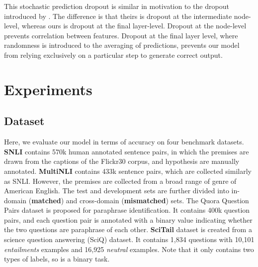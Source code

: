 \documentclass[11pt,a4paper]{article}
\begin{document}
This stochastic prediction dropout is similar in motivation to the dropout introduced by \cite{srivastava2014dropout}. The difference is that theirs is dropout at the intermediate node-level, whereas ours is dropout at the final layer-level. Dropout at the node-level prevents correlation between features. Dropout at the final layer level, where randomness is introduced to the averaging of predictions, prevents our model from relying exclusively on a particular step to generate correct output. 
 \section{Experiments}
\label{sec:exp}
\subsection{Dataset}
\label{sec:data}
Here, we evaluate our model in terms of accuracy on four benchmark datasets. \textbf{SNLI} \cite{bowman2015large} contains 570k human annotated sentence pairs, in which the premises are drawn from the captions of the Flickr30 corpus, and hypothesis are manually annotated. \textbf{MultiNLI} \cite{2017arXiv170405426W} contains 433k sentence pairs, which are collected similarly as SNLI. However, the premises are collected from a broad range of genre of American English. The test and development sets are further divided into in-domain (\textbf{matched}) and cross-domain (\textbf{mismatched}) sets.  The Quora Question Pairs dataset \cite{wang2017bilateral} is proposed for paraphrase identification. It contains 400k question pairs, and each question pair is annotated with a binary value indicating whether the two questions are paraphrase of each other. \textbf{SciTail} dataset is created from a science question answering (SciQ) dataset. It contains 1,834 questions with 10,101 \textit{entailments} examples and 16,925 \textit{neutral} examples. Note that it only contains two types of labels, so is a binary task. 
\end{document}
